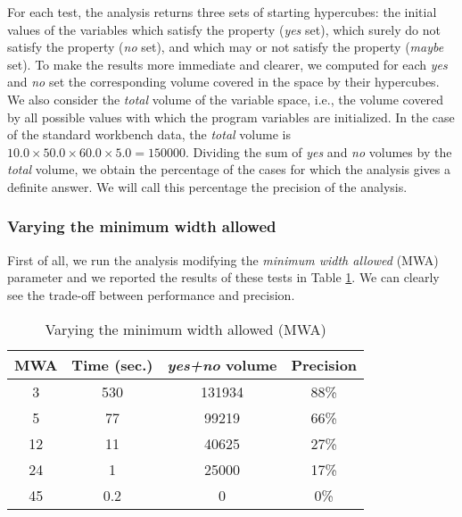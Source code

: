 For each test, the analysis returns three sets of starting hypercubes: the initial values of the variables which satisfy the property (\textit{yes} set), which surely do not satisfy the property (\textit{no} set), and which may or not satisfy the property (\textit{maybe} set). To make the results more immediate and clearer, we computed for each \emph{yes} and \emph{no} set the corresponding volume covered in the space by their hypercubes. We also consider the \emph{total} volume of the variable space, i.e., the volume covered by all possible values with which the program variables are initialized. In the case of the standard workbench data, the \emph{total} volume is $10.0 \times 50.0 \times 60.0 \times 5.0 = 150000$. Dividing the sum of \emph{yes} and \emph{no} volumes by the \emph{total} volume, we obtain the percentage of the cases for which the analysis gives a definite answer. We will call this percentage the precision of the analysis. 


\subsubsection{Varying the minimum width allowed}
First of all, we run the analysis modifying the \emph{minimum width allowed} (MWA) parameter and we reported the results of these tests in Table \ref{table:minWidthAllowed}. We can clearly see the trade-off between performance and precision. %

\vspace{-15pt}
\begin{table}[ht]
\scriptsize
\caption{Varying the minimum width allowed (MWA)}
\centering 
\begin{tabular}{| c | c | c | c |}
\hline
MWA & Time (sec.) & \emph{yes+no} volume & Precision \\ \hline
3 & 530 & 131934 & 88\%  \\ %
5 & 77 & 99219 & 66\%  \\ %
12 & 11 & 40625 & 27\%  \\ %
24 & 1 & 25000 & 17\% \\ %
45 & 0.2 & 0 & 0\% \\ \hline 
\end{tabular}
\label{table:minWidthAllowed} 
\end{table}
\vspace{-30pt}

